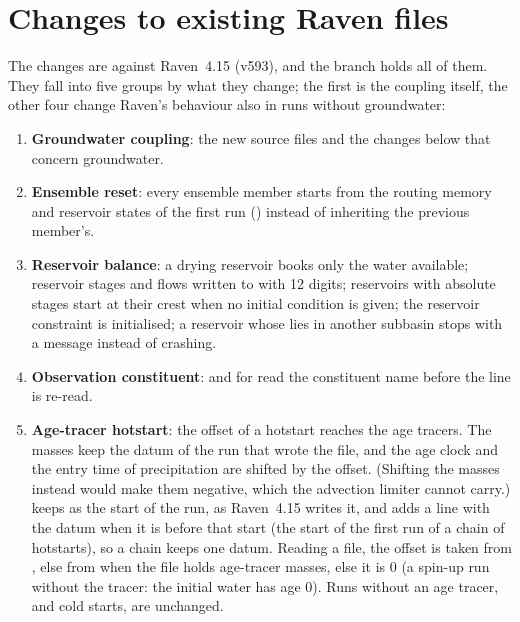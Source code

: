 \section{Changes to existing Raven files}\label{sec:coreflix}
The changes are against Raven~4.15 (v593), and the branch  holds all of them. They fall into five
groups by what they change; the first is the coupling itself, the other four change Raven's behaviour also in runs
without groundwater:
\begin{enumerate}
\item \textbf{Groundwater coupling}: the new source files and the changes below that concern groundwater.
\item \textbf{Ensemble reset}: every ensemble member starts from the routing memory and
      reservoir states of the first run () instead of inheriting the previous member's.
\item \textbf{Reservoir balance}: a drying reservoir books only the water available;
      reservoir stages and flows written to  with 12 digits; reservoirs with absolute stages start at
      their crest when no initial condition is given; the reservoir constraint is initialised; a reservoir whose
       lies in another subbasin stops with a message instead of crashing.
\item \textbf{Observation constituent}:  and
       for  read the constituent name before the line is re-read.
\item \textbf{Age-tracer hotstart}: the  offset of a hotstart reaches
      the age tracers. The masses keep the datum of the run that wrote the file, and the age clock and the entry time of
      precipitation are shifted by the offset. (Shifting the masses instead would make them negative, which the advection
      limiter cannot carry.)  keeps  as the start of the run, as Raven~4.15 writes it,
      and adds a line  with the datum when it is before that start (the start of the first run of a
      chain of hotstarts), so a chain keeps one datum. Reading a file, the offset is taken from , else
      from  when the file holds age-tracer masses, else it is 0 (a spin-up run without the tracer: the
      initial water has age 0). Runs without an age tracer, and cold starts, are unchanged.
\end{enumerate}
